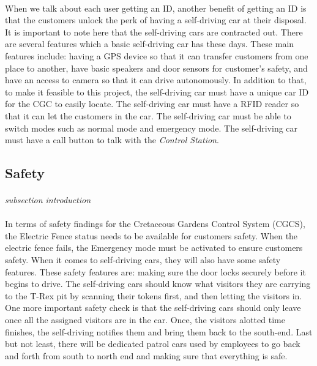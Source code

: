 \documentclass[12pt]{article}
\begin{document}
	\paragraph{} When we talk about each user getting an ID, another benefit of getting an 
	ID is that the customers unlock the perk of having a self-driving car at their disposal. 
	It is important to note here that the self-driving cars are contracted out. There are 
	several features which a basic self-driving car has these days. These main features 
	include: having a GPS device so that it can transfer customers from one place to another, 
	have basic speakers and door sensors for customer's safety, and have an access to camera 
	so that it can drive autonomously. In addition to that, to make it feasible to this project,
	the self-driving car must have a unique car ID for the CGC to easily locate. The self-driving 
	car must have a RFID reader so that it can let the customers in the car. The self-driving car 
	must be able to switch modes such as normal mode and emergency mode. The self-driving car must
	 have a call button to talk with the \textit{Control Station}.
	
	\subsection{Safety}
	\paragraph{} \textit{subsection introduction}
	\paragraph{} In terms of safety findings for the Cretaceous Gardens Control System (CGCS), the Electric Fence status needs to be available for customers safety. When the
electric fence fails, the Emergency mode must be activated to ensure customers safety. When it comes to self-driving cars, they will also have some safety
features. These safety features are: making sure the door locks securely before it begins to drive. The self-driving cars should know what visitors they are
carrying to the T-Rex pit by scanning their tokens first, and then letting the visitors in. One more important safety check is that the self-driving cars
should only leave once all the assigned visitors are in the car. Once, the visitors alotted time finishes, the self-driving notifies them and bring them
back to the south-end. Last but not least, there will be dedicated patrol cars used by employees to go back and forth from south to north end and making 
sure that everything is safe.  
\end{document}
